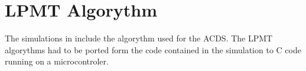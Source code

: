 \chapter{\acs{LPMT} Algorythm}

The simulations in \cite{mench11} include the algorythm used for the \ac{ACDS}. The \ac{LPMT} algorythms had to be ported form the \matlab code contained in the simulation to C code running on a microcontroler. 

